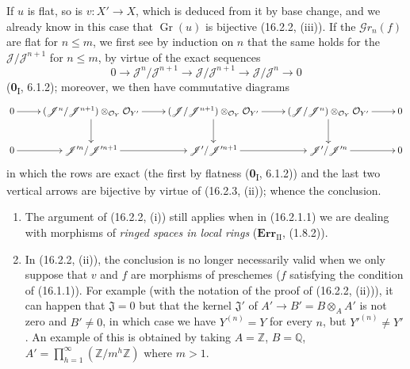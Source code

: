 If $u$ is flat, so is $v:X'\to X$, which is deduced from it by
base change, and we already know in this case that $\operatorname{Gr}(u)$ is
bijective (16.2.2, (iii)). If the $\mathscr{G}r_n(f)$ are flat for
$n\leq m$, we first see by induction on $n$ that the same holds for the
$\mathscr{J}/\mathscr{J}^{n+1}$ for $n\leq m$, by virtue of the exact sequences
\[
  0\longrightarrow\mathscr{J}^n/\mathscr{J}^{n+1}
  \longrightarrow\mathscr{J}/\mathscr{J}^{n+1}
  \longrightarrow\mathscr{J}/\mathscr{J}^n
  \longrightarrow 0
\]
(\textbf{0}\textsubscript{I}, 6.1.2); moreover, we then have commutative diagrams
\[
  \xymatrix{
    0 \ar[r] &
    (\mathscr{J}^n/\mathscr{J}^{n+1})
      \otimes_{\mathcal{O}_Y}\mathcal{O}_{Y'}
      \ar[r]\ar[d] &
    (\mathscr{J}/\mathscr{J}^{n+1})
      \otimes_{\mathcal{O}_Y}\mathcal{O}_{Y'}
      \ar[r]\ar[d] &
    (\mathscr{J}/\mathscr{J}^n)
      \otimes_{\mathcal{O}_Y}\mathcal{O}_{Y'}
      \ar[r]\ar[d] & 0 \\
    0 \ar[r] &
    \mathscr{J}'^n/\mathscr{J}'^{n+1}
      \ar[r] &
    \mathscr{J}'/\mathscr{J}'^{n+1}
      \ar[r] &
    \mathscr{J}'/\mathscr{J}'^n
      \ar[r] & 0
  }
\]
in which the rows are exact (the first by flatness
(\textbf{0}\textsubscript{I}, 6.1.2)) and the last two vertical arrows are
bijective by virtue of (16.2.3, (ii)); whence the conclusion.

\begin{remarks}[16.2.5]
\label{IV.16.2.5}
\begin{enumerate}
\item[(i)] The argument of (16.2.2, (i)) still applies when in
(16.2.1.1) we are dealing with morphisms of \emph{ringed spaces in local rings}
($\mathbf{Err}_{\mathrm{II}}$, (1.8.2)).
\item[(ii)] In (16.2.2, (ii)), the conclusion is no longer necessarily valid
when we only suppose that $v$ and $f$ are morphisms of preschemes
($f$ satisfying the condition of (16.1.1)). For example (with the notation of the
proof of (16.2.2, (ii))), it can happen that $\mathfrak{J}=0$ but that
the kernel $\mathfrak{J}'$ of $A'\to B'=B\otimes_A A'$ is not zero and
$B'\neq 0$, in which case we have $Y^{(n)}=Y$ for every $n$, but
$Y'^{(n)}\neq Y'$. An example of this is obtained by taking
$A=\mathbb{Z}$, $B=\mathbb{Q}$,
$A'=\prod_{h=1}^{\infty}(\mathbb{Z}/m^h\mathbb{Z})$ where $m>1$.
\end{enumerate}
\end{remarks}

